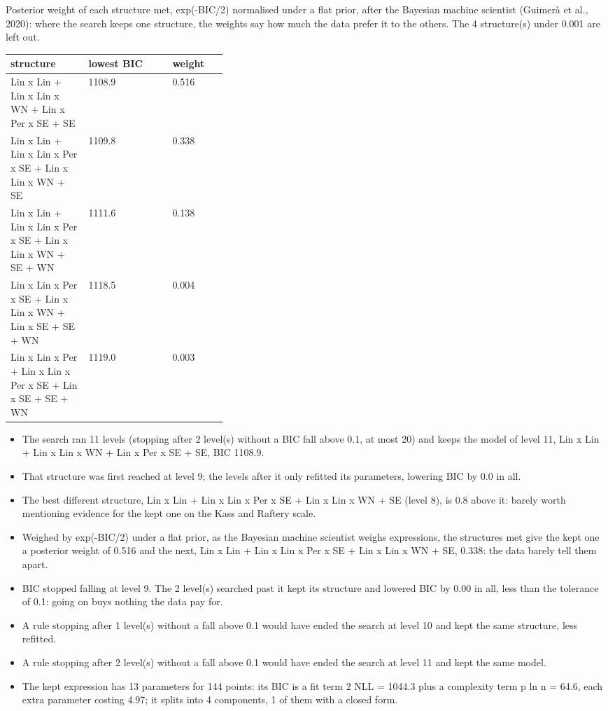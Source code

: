 \documentclass[11pt,a4paper]{article}
\begin{document}
Posterior weight of each structure met, exp(-BIC/2) normalised under a flat prior, after the Bayesian machine scientist (Guimerà et al., 2020): where the search keeps one structure, the weights say how much the data prefer it to the others. The 4 structure(s) under 0.001 are left out.

\begin{center}\footnotesize
\begin{tabular}{p{0.36\linewidth}ll}
\toprule
structure & lowest BIC & weight \\
\midrule
Lin x Lin + Lin x Lin x WN + Lin x Per x SE + SE & 1108.9 & 0.516 \\
Lin x Lin + Lin x Lin x Per x SE + Lin x Lin x WN + SE & 1109.8 & 0.338 \\
Lin x Lin + Lin x Lin x Per x SE + Lin x Lin x WN + SE + WN & 1111.6 & 0.138 \\
Lin x Lin x Per x SE + Lin x Lin x WN + Lin x SE + SE + WN & 1118.5 & 0.004 \\
Lin x Lin x Per + Lin x Lin x Per x SE + Lin x SE + SE + WN & 1119.0 & 0.003 \\
\bottomrule
\end{tabular}
\end{center}

\begin{itemize}
\item The search ran 11 levels (stopping after 2 level(s) without a BIC fall above 0.1, at most 20) and keeps the model of level 11, Lin x Lin + Lin x Lin x WN + Lin x Per x SE + SE, BIC 1108.9.
\item That structure was first reached at level 9; the levels after it only refitted its parameters, lowering BIC by 0.0 in all.
\item The best different structure, Lin x Lin + Lin x Lin x Per x SE + Lin x Lin x WN + SE (level 8), is 0.8 above it: barely worth mentioning evidence for the kept one on the Kass and Raftery scale.
\item Weighed by exp(-BIC/2) under a flat prior, as the Bayesian machine scientist weighs expressions, the structures met give the kept one a posterior weight of 0.516 and the next, Lin x Lin + Lin x Lin x Per x SE + Lin x Lin x WN + SE, 0.338: the data barely tell them apart.
\item BIC stopped falling at level 9. The 2 level(s) searched past it kept its structure and lowered BIC by 0.00 in all, less than the tolerance of 0.1: going on buys nothing the data pay for.
\item A rule stopping after 1 level(s) without a fall above 0.1 would have ended the search at level 10 and kept the same structure, less refitted.
\item A rule stopping after 2 level(s) without a fall above 0.1 would have ended the search at level 11 and kept the same model.
\item The kept expression has 13 parameters for 144 points: its BIC is a fit term 2 NLL = 1044.3 plus a complexity term p ln n = 64.6, each extra parameter costing 4.97; it splits into 4 components, 1 of them with a closed form.
\end{itemize}
\end{document}
